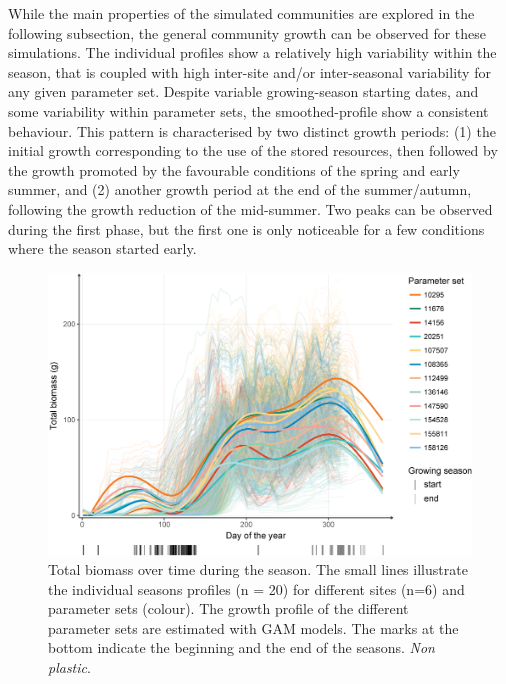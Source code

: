 While the main properties of the simulated communities are explored in the following subsection, the general community growth can be observed for these simulations. The individual profiles show a relatively high variability within the season, that is coupled with high inter-site and/or inter-seasonal variability for any given parameter set.
Despite variable growing-season starting dates, and some variability within parameter sets, the smoothed-profile show a consistent behaviour. This pattern is characterised by two distinct growth periods: (1) the initial growth  corresponding to the use of the stored resources, then followed by the growth promoted by the favourable conditions of the spring and early summer, and (2) another growth period at the end of the summer/autumn, following the growth reduction of the mid-summer. Two peaks can be observed during the first phase, but the first one is only noticeable for a few conditions where the season started early.  

\begin{figure}%
    \includegraphics[width=1\linewidth]{./2_PP/Figures/Comm/biomass_season_non_plastic2.png}%
  \caption[Total biomass profile during the season]{Total biomass over time during the season. The small lines illustrate the individual seasons profiles (n = 20) for different sites (n=6) and parameter sets (colour). The growth profile of the different parameter sets are estimated with GAM models. The marks at the bottom indicate the beginning and the end of the seasons. \textit{Non plastic}.}
  \label{fg:species_per_plant}
\end{figure}

